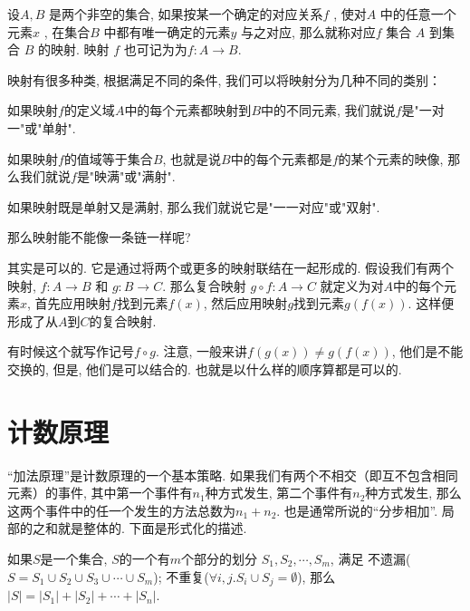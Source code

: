 \begin{definition}[映射]
  设$A,B$ 是两个非空的集合, 如果按某一个确定的对应关系$f$ , 
  使对$A$ 中的任意一个元素$x$ , 在集合$B$ 中都有唯一确定的元素$y$ 与之对应, 
  那么就称对应$f$ 集合 $A$ 到集合 $B$ 的映射. 映射 $f$ 也可记为为$f:A\to B$.
\end{definition}



映射有很多种类, 根据满足不同的条件, 我们可以将映射分为几种不同的类别：

\begin{definition}
  如果映射$f$的定义域$A$中的每个元素都映射到$B$中的不同元素, 我们就说$f$是"一对一"或"单射". 
\end{definition}

\begin{definition}
  如果映射$f$的值域等于集合$B$, 也就是说$B$中的每个元素都是$f$的某个元素的映像, 那么我们就说$f$是"映满"或"满射". 
\end{definition}

\begin{definition}
  如果映射既是单射又是满射, 那么我们就说它是"一一对应"或"双射". 
\end{definition}

 那么映射能不能像一条链一样呢? 

其实是可以的. 它是通过将两个或更多的映射联结在一起形成的. 
假设我们有两个映射, $f: A \to B$ 和 $g: B \to C$. 
那么复合映射 $g\circ f: A \to C$ 就定义为对$A$中的每个元素$x$, 
首先应用映射$f$找到元素$f(x)$, 然后应用映射$g$找到元素$g(f(x))$. 
这样便形成了从$A$到$C$的复合映射. 

有时候这个就写作记号$f\circ g$. 注意, 一般来讲$f(g(x))\neq g(f(x))$, 他们是不能交换的, 
但是, 他们是可以结合的. 也就是以什么样的顺序算都是可以的. 

\section{计数原理}

 ``加法原理''是计数原理的一个基本策略. 
如果我们有两个不相交（即互不包含相同元素）的事件, 其中第一个事件有$n_1$种方式发生, 
第二个事件有$n_2$种方式发生, 那么这两个事件中的任一个发生的方法总数为$n_1 + n_2$. 
也是通常所说的``分步相加''. 局部的之和就是整体的. 下面是形式化的描述. 

\begin{principle}[加法原理]
如果$S$是一个集合, $S$的一个有$m$个部分的划分
$S_1, S_2,\cdots, S_m$, 满足
不遗漏($S=S_1 \cup S_2 \cup S_3 \cup \cdots \cup S_m$); 不重复($\forall 
i,j. S_i \cup S_j = \emptyset$), 那么$|S|=|S_1|+|S_2|+\cdots+|S_n|$. 
\end{principle}


